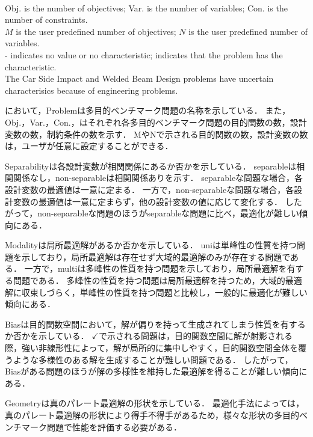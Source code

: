 \documentclass[../main/main]{subfiles}
\begin{document}
\begin{table}[htbp]
\begin{tabular}{cccc||cccc}
\hline
\end{tabular}
\\
{\scriptsize Obj. is the number of objectives; Var. is the number of variables; Con. is the number of constraints.}\\
{\scriptsize $M$ is the user predefined number of objectives; $N$ is the user predefined number of variables.}\\
{\scriptsize - indicates no value or no characteristic; \checkmark indicates that the problem has the characteristic.}\\
{\scriptsize The Car Side Impact and Welded Beam Design problems have uncertain characterisics because of engineering problems.}
\end{table}


において，Problemは多目的ベンチマーク問題の名称を示している．
また，Obj.，Var.，Con.，はそれぞれ各多目的ベンチマーク問題の目的関数の数，設計変数の数，制約条件の数を示す．
MやNで示される目的関数の数，設計変数の数は，ユーザが任意に設定することができる．

Separabilityは各設計変数が相関関係にあるか否かを示している．
separableは相関関係なし，non-separableは相関関係ありを示す．
separableな問題な場合，各設計変数の最適値は一意に定まる．
一方で，non-separableな問題な場合，各設計変数の最適値は一意に定まらず，他の設計変数の値に応じて変化する．
したがって，non-separableな問題のほうがseparableな問題に比べ，最適化が難しい傾向にある．

Modalityは局所最適解があるか否かを示している．
uniは単峰性の性質を持つ問題を示しており，局所最適解は存在せず大域的最適解のみが存在する問題である．
一方で，multiは多峰性の性質を持つ問題を示しており，局所最適解を有する問題である．
多峰性の性質を持つ問題は局所最適解を持つため，大域的最適解に収束しづらく，単峰性の性質を持つ問題と比較し，一般的に最適化が難しい傾向にある．

Biasは目的関数空間において，解が偏りを持って生成されてしまう性質を有するか否かを示している．
$\checkmark$で示される問題は，目的関数空間に解が射影される際，強い非線形性によって，解が局所的に集中しやすく，目的関数空間全体を覆うような多様性のある解を生成することが難しい問題である．
したがって，Biasがある問題のほうが解の多様性を維持した最適解を得ることが難しい傾向にある．

Geometryは真のパレート最適解の形状を示している．
最適化手法によっては，真のパレート最適解の形状により得手不得手があるため，様々な形状の多目的ベンチマーク問題で性能を評価する必要がある．
\end{document}
